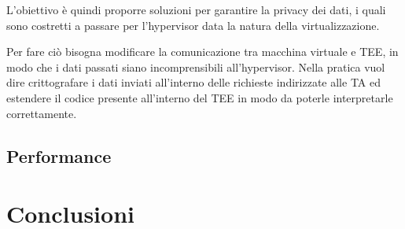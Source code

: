 \documentclass[12pt,italian]{report}
\begin{document}
	L'obiettivo è quindi proporre soluzioni per garantire la privacy dei dati, i quali sono costretti a passare per l'hypervisor data la natura della virtualizzazione.
	
	\bigbreak
	
	Per fare ciò bisogna modificare la comunicazione tra macchina virtuale e TEE, in modo che i dati passati siano incomprensibili all'hypervisor. Nella pratica vuol dire crittografare i dati inviati all'interno delle richieste indirizzate alle TA ed estendere il codice presente all'interno del TEE in modo da poterle interpretarle correttamente.
	
	\newpage
	
	\section{Performance}
	\label{sec:dati}
	
	\chapter{Conclusioni}
	\label{cap:conclusioni}
	
	
	
	
\end{document}

